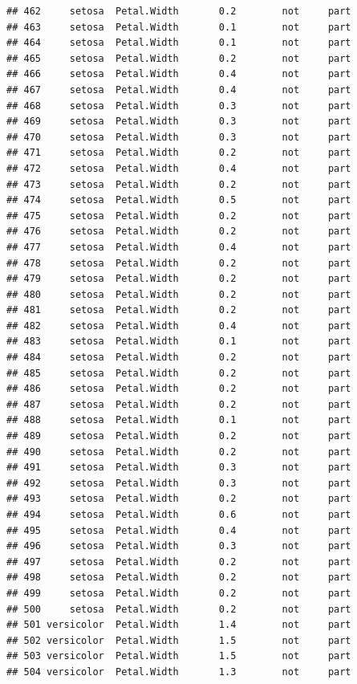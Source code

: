 \documentclass[krantz2]{krantz}\usepackage{knitr}%
\begin{document}
\begin{knitrout}
\begin{kframe}
\begin{verbatim}
## 462     setosa  Petal.Width       0.2        not     part
## 463     setosa  Petal.Width       0.1        not     part
## 464     setosa  Petal.Width       0.1        not     part
## 465     setosa  Petal.Width       0.2        not     part
## 466     setosa  Petal.Width       0.4        not     part
## 467     setosa  Petal.Width       0.4        not     part
## 468     setosa  Petal.Width       0.3        not     part
## 469     setosa  Petal.Width       0.3        not     part
## 470     setosa  Petal.Width       0.3        not     part
## 471     setosa  Petal.Width       0.2        not     part
## 472     setosa  Petal.Width       0.4        not     part
## 473     setosa  Petal.Width       0.2        not     part
## 474     setosa  Petal.Width       0.5        not     part
## 475     setosa  Petal.Width       0.2        not     part
## 476     setosa  Petal.Width       0.2        not     part
## 477     setosa  Petal.Width       0.4        not     part
## 478     setosa  Petal.Width       0.2        not     part
## 479     setosa  Petal.Width       0.2        not     part
## 480     setosa  Petal.Width       0.2        not     part
## 481     setosa  Petal.Width       0.2        not     part
## 482     setosa  Petal.Width       0.4        not     part
## 483     setosa  Petal.Width       0.1        not     part
## 484     setosa  Petal.Width       0.2        not     part
## 485     setosa  Petal.Width       0.2        not     part
## 486     setosa  Petal.Width       0.2        not     part
## 487     setosa  Petal.Width       0.2        not     part
## 488     setosa  Petal.Width       0.1        not     part
## 489     setosa  Petal.Width       0.2        not     part
## 490     setosa  Petal.Width       0.2        not     part
## 491     setosa  Petal.Width       0.3        not     part
## 492     setosa  Petal.Width       0.3        not     part
## 493     setosa  Petal.Width       0.2        not     part
## 494     setosa  Petal.Width       0.6        not     part
## 495     setosa  Petal.Width       0.4        not     part
## 496     setosa  Petal.Width       0.3        not     part
## 497     setosa  Petal.Width       0.2        not     part
## 498     setosa  Petal.Width       0.2        not     part
## 499     setosa  Petal.Width       0.2        not     part
## 500     setosa  Petal.Width       0.2        not     part
## 501 versicolor  Petal.Width       1.4        not     part
## 502 versicolor  Petal.Width       1.5        not     part
## 503 versicolor  Petal.Width       1.5        not     part
## 504 versicolor  Petal.Width       1.3        not     part

\end{verbatim}
\end{kframe}
\end{knitrout}
\end{document}
